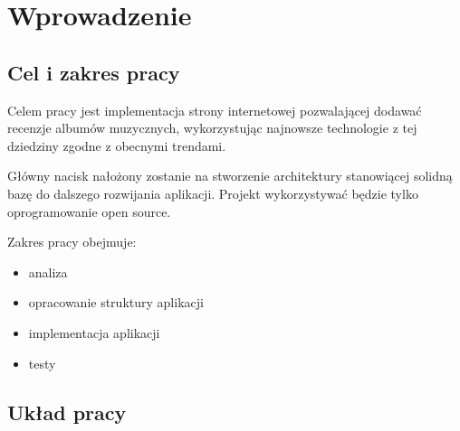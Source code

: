 \chapter{Wprowadzenie}
\section{Cel i zakres pracy}
	Celem pracy jest implementacja strony internetowej pozwalającej dodawać recenzje albumów muzycznych,
	wykorzystując najnowsze technologie z tej dziedziny zgodne z obecnymi trendami.

	Główny nacisk nałożony zostanie na stworzenie architektury stanowiącej solidną bazę do dalszego rozwijania aplikacji.
	Projekt wykorzystywać będzie tylko oprogramowanie open source.

	Zakres pracy obejmuje:
	\begin{itemize}
		\item analiza 
		\item opracowanie struktury aplikacji
		\item implementacja aplikacji
		\item testy 
	\end{itemize}
	
\section{Układ pracy}
